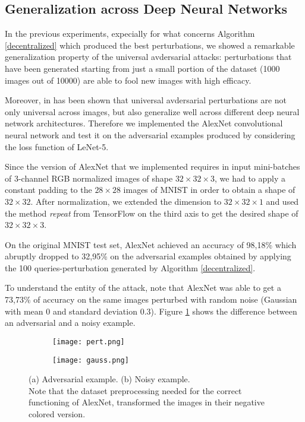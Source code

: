 \subsection{Generalization across Deep Neural Networks}
In the previous experiments, expecially for what concerns Algorithm \ref{decentralized} which produced the best perturbations, we showed a remarkable generalization property of the universal avdersarial attacks: perturbations that have been generated starting from just a small portion of the dataset (1000 images out of 10000) are able to fool new images with high efficacy.

Moreover, in \cite{A2} has been shown that universal avdersarial perturbations are not only universal across images, but also generalize well across different deep neural network architectures. Therefore we implemented the AlexNet convolutional neural network and test it on the adversarial examples produced by considering the loss function of LeNet-5.

Since the version of AlexNet that we implemented requires in input mini-batches of 3-channel RGB normalized images of shape $32\times 32\times 3$, we had to apply a constant padding to the $28\times 28$ images of MNIST in order to obtain a shape of $32\times 32$. After normalization, we extended the dimension to $32\times 32\times 1$ and used the method \textit{repeat} from TensorFlow on the third axis to get the desired shape of $32\times 32\times 3$. 

On the original MNIST test set, AlexNet achieved an accuracy of 98,18\% which abruptly dropped to 32,95\% on the adversarial examples obtained by applying the 100 queries-perturbation generated by Algorithm \ref{decentralized}.

To understand the entity of the attack, note that AlexNet was able to get a 73,73\% of accuracy on the same images perturbed with random noise (Gaussian with mean 0 and standard deviation 0.3). Figure \ref{fig:gen} shows the difference between an adversarial and a noisy example.

\begin{figure}[h]
	\centering
	\begin{subfigure}[b]{0.15\textwidth}
		\centering
		\texttt{[image: pert.png]}
		\caption{}
	\end{subfigure}
	\hspace{1cm}
	\begin{subfigure}[b]{0.15\textwidth}
		\texttt{[image: gauss.png]}
		\caption{}
	\end{subfigure}
	\caption{{\small (a) Adversarial example. (b) Noisy example.\\ Note that the dataset preprocessing needed for the correct functioning of AlexNet, transformed the images in their negative colored version.}}
	\label{fig:gen}
\end{figure}